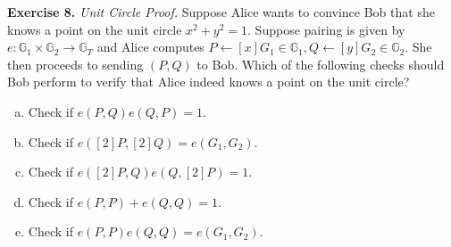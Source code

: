 \documentclass[../lecture-notes.tex]{subfiles}
\begin{document}
\textbf{Exercise 8.} \textit{Unit Circle Proof.} Suppose Alice wants to convince Bob that she knows a point on the unit circle $x^2+y^2=1$. Suppose pairing is given by $e: \mathbb{G}_1 \times \mathbb{G}_2 \to \mathbb{G}_T$ and Alice computes $P \gets [x]G_1 \in \mathbb{G}_1, Q \gets [y]G_2 \in \mathbb{G}_2$. She then proceeds to sending $(P,Q)$ to Bob. Which of the following checks should Bob perform to verify that Alice indeed knows a point on the unit circle?
\begin{enumerate}[a)]
    \item Check if $e(P,Q)e(Q,P)=1$.
    \item Check if $e([2]P,[2]Q) = e(G_1,G_2)$.
    \item Check if $e([2]P,Q)e(Q,[2]P) = 1$.
    \item Check if $e(P,P)+e(Q,Q) = 1$.
    \item Check if $e(P,P)e(Q,Q)=e(G_1,G_2)$.
\end{enumerate}
\end{document}
